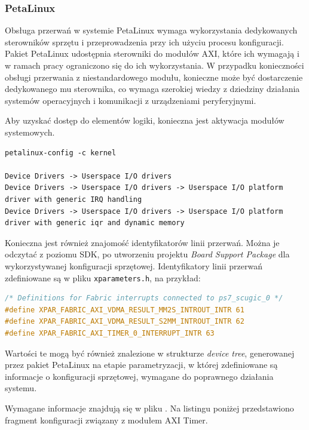 \subsubsection{PetaLinux}

Obsługa przerwań w systemie PetaLinux wymaga wykorzystania dedykowanych sterowników sprzętu i przeprowadzenia przy ich użyciu procesu konfiguracji. Pakiet PetaLinux udostępnia sterowniki do modułów AXI, które ich wymagają i w ramach pracy ograniczono się do ich wykorzystania. W przypadku konieczności obsługi przerwania z niestandardowego modułu, konieczne może być dostarczenie dedykowanego mu sterownika, co wymaga szerokiej wiedzy z dziedziny działania systemów operacyjnych i komunikacji z urządzeniami peryferyjnymi.

Aby uzyskać dostęp do elementów logiki, konieczna jest aktywacja modułów systemowych.

\begin{lstlisting}[breaklines=true, caption=Konfiguracja modułów systemowych.]
petalinux-config -c kernel

Device Drivers -> Userspace I/O drivers
Device Drivers -> Userspace I/O drivers -> Userspace I/O platform driver with generic IRQ handling
Device Drivers -> Userspace I/O drivers -> Userspace I/O platform driver with generic iqr and dynamic memory
\end{lstlisting}

Konieczna jest również znajomość identyfikatorów linii przerwań. Można je odczytać z poziomu SDK, po utworzeniu projektu \emph{Board Support Package} dla wykorzystywanej konfiguracji sprzętowej. Identyfikatory linii przerwań zdefiniowane są w pliku \texttt{xparameters.h}, na przykład:

\begin{lstlisting}[language=C]
/* Definitions for Fabric interrupts connected to ps7_scugic_0 */
#define XPAR_FABRIC_AXI_VDMA_RESULT_MM2S_INTROUT_INTR 61
#define XPAR_FABRIC_AXI_VDMA_RESULT_S2MM_INTROUT_INTR 62
#define XPAR_FABRIC_AXI_TIMER_0_INTERRUPT_INTR 63
\end{lstlisting}

Wartości te mogą być również znalezione w strukturze \textit{device tree}, generowanej przez pakiet PetaLinux na etapie parametryzacji, w której zdefiniowane są informacje o konfiguracji sprzętowej, wymagane do poprawnego działania systemu.

Wymagane informacje znajdują się w pliku . Na listingu poniżej przedstawiono fragment konfiguracji związany z modułem AXI Timer.

